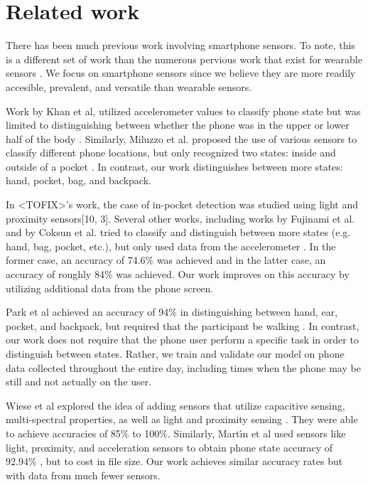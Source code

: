 \section{Related work}
There has been much previous work involving smartphone sensors.
To note, this is a different set of work than the numerous pervious work that exist for wearable sensors \cite{Kunze2005}.
We focus on smartphone sensors since we believe they are more readily accesible, prevalent, and versatile than wearable sensors.

Work by Khan et al, utilized accelerometer values to classify phone state 
but was limited to distinguishing between whether the phone was in the upper or lower half of the body \cite{Khan2010}.
Similarly, Miluzzo et al. proposed the use of various sensors to classify different phone locations, 
but only recognized two states: inside and outside of a pocket \cite{Miluzzo2010}.
In contrast, our work distinguishes between more states: hand, pocket, bag, and backpack. 

 In <TOFIX>'s work, the case of in-pocket detection was studied using light and proximity sensors[10, 3].
Several other works, including works by Fujinami et al. and by Coksun et al. tried to classify and distinguish between more states (e.g. hand, bag, pocket, etc.), but only used data from the accelerometer \cite{Fujinami2013,Coksun15}. 
In the former case, an accuracy of 74.6\% was achieved and in the latter case, an accuracy of roughly 84\% was achieved.
Our work improves on this accuracy by utilizing additional data from the phone screen.

Park et al achieved an accuracy of 94\% in distinguishing between hand, ear, pocket, and backpack, but required that the participant be walking \cite{Park2012}. 
In contrast, our work does not require that the phone user perform a specific task in order to distinguish between states.
Rather, we train and validate our model on phone data collected throughout the entire day, 
 including times when the phone may be still and not actually on the user. 


Wiese et al explored the idea of adding sensors that utilize capacitive sensing,  multi-spectral properties, as well as light and proximity sensing \cite{Wiese2013}.
They were able to achieve accuracies of 85\% to 100\%.
Similarly, Mart\'{\i}n et al used sensors like light, proximity, and acceleration sensors
to obtain phone state accuracy of 92.94\% \cite{Martin}, but to cost in file size.
Our work achieves similar accuracy rates but with data from much fewer sensors.  

